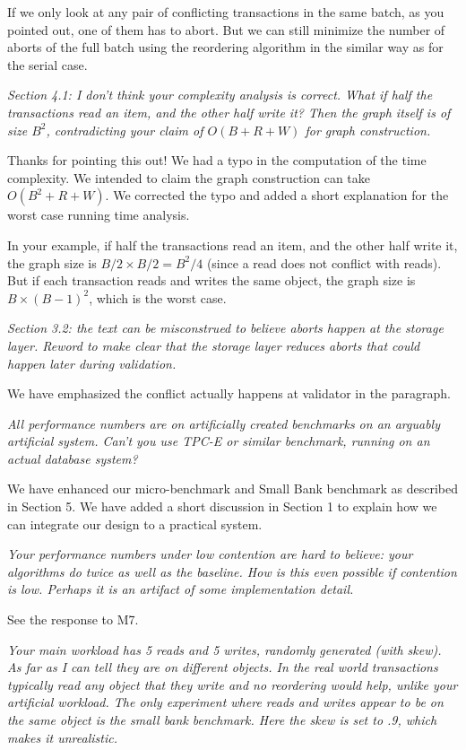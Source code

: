 \documentclass{article}
\begin{document}
If we only look at any pair of conflicting transactions in the same batch, as you pointed out, one of them has to abort. But we can still minimize the number of aborts of the full batch using the reordering algorithm in the similar way as for the serial case.

\emph{Section 4.1: I don't think your complexity analysis is correct. What if half the transactions read an item, and the other half write it? Then the graph itself is of size $B^2$, contradicting your claim of $O(B+R+W)$ for graph construction.}

Thanks for pointing this out! We had a typo in the computation of the time complexity. We intended to claim the graph construction can take $O(B^2+R+W)$. We corrected the typo and added a short explanation for the worst case running time analysis.

In your example, if half the transactions read an item, and the other half write it, the graph size is $B/2\times B/2=B^2/4$ (since a read does not conflict with reads). But if each transaction reads and writes the same object, the graph size is $B\times (B-1)^2$, which is the worst case.

\emph{Section 3.2: the text can be misconstrued to believe aborts happen at the storage layer. Reword to make clear that the storage layer reduces aborts that could happen later during validation.}

We have emphasized the conflict actually happens at validator in the paragraph. 

\emph{All performance numbers are on artificially created benchmarks on an arguably artificial system. Can't you use TPC-E or similar benchmark, running on an actual database system?}


We have enhanced our micro-benchmark and Small Bank benchmark as described in Section 5. We have added a short discussion in Section 1 to explain how we can integrate our design to a practical system.

\emph{Your performance numbers under low contention are hard to believe: your algorithms do twice as well as the baseline. How is this even possible if contention is low. Perhaps it is an artifact of some implementation detail.}


See the response to M7.

\emph{Your main workload has 5 reads and 5 writes, randomly generated (with skew). As far as I can tell they are on different objects. In the real world transactions typically read any object that they write and no reordering would help, unlike your artificial workload. The only experiment where reads and writes appear to be on the same object is the small bank benchmark. Here the skew is set to .9, which makes it unrealistic. }
\end{document}
